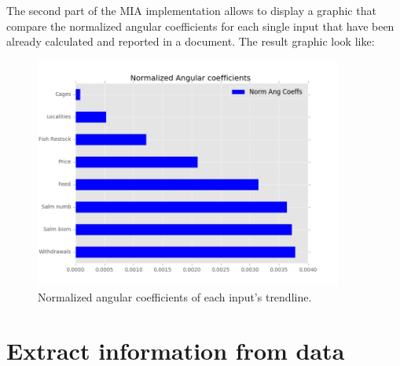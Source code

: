 \newpage

The second part of the MIA implementation allows to display a graphic that compare the normalized angular coefficients for each single input that have been already calculated and reported in a document. The result graphic look like:

\begin{figure}[H]
	\centering
    \includegraphics[width=0.90\textwidth]{Files/Norm_Ang_Coeffs.jpg}
    \caption{Normalized angular coefficients of each input's trendline.}
\end{figure}


\newpage
\section{Extract information from data}

